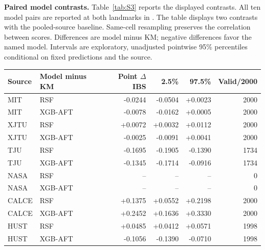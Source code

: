 \documentclass[10pt,a4paper]{article}
\begin{document}

\textbf{Paired model contrasts.} Table~\ref{tab:S3} reports the displayed contrasts. All ten model pairs are reported at both landmarks in . The table displays two contrasts with the pooled-source baseline. Same-cell resampling preserves the correlation between scores. Differences are model minus KM; negative differences favor the named model. Intervals are exploratory, unadjusted pointwise 95\% percentiles conditional on fixed predictions and the source.
\begin{center}\small
\begin{minipage}{\linewidth}\centering
{}\label{tab:S3}
\begin{tabular}{llrrrr}\toprule
Source & Model minus KM & Point $\Delta$IBS & 2.5\% & 97.5\% & Valid/2000\\\midrule
MIT & RSF & -0.0244 & -0.0504 & +0.0023 & 2000\\
MIT & XGB-AFT & -0.0078 & -0.0162 & +0.0005 & 2000\\
XJTU & RSF & +0.0072 & +0.0032 & +0.0112 & 2000\\
XJTU & XGB-AFT & -0.0025 & -0.0091 & +0.0041 & 2000\\
TJU & RSF & -0.1695 & -0.1905 & -0.1390 & 1734\\
TJU & XGB-AFT & -0.1345 & -0.1714 & -0.0916 & 1734\\
NASA & RSF & -- & -- & -- & 0\\
NASA & XGB-AFT & -- & -- & -- & 0\\
CALCE & RSF & +0.1375 & +0.0552 & +0.2198 & 2000\\
CALCE & XGB-AFT & +0.2452 & +0.1636 & +0.3330 & 2000\\
HUST & RSF & +0.0485 & +0.0412 & +0.0571 & 1998\\
HUST & XGB-AFT & -0.1056 & -0.1390 & -0.0710 & 1998\\
\bottomrule\end{tabular}\end{minipage}
\end{center}
\end{document}
